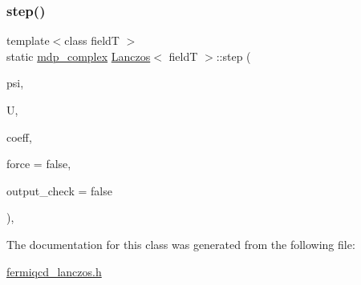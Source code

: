 \subsubsection{\texorpdfstring{step()}{step()}}
{\footnotesize\ttfamily template$<$class fieldT $>$ \\
static \hyperlink{classmdp__complex}{mdp\+\_\+complex} \hyperlink{class_lanczos}{Lanczos}$<$ fieldT $>$\+::step (\begin{DoxyParamCaption}\item[{fieldT \&}]{psi,  }\item[{\hyperlink{classgauge__field}{gauge\+\_\+field} \&}]{U,  }\item[{\hyperlink{classcoefficients}{coefficients} \&}]{coeff,  }\item[{bool}]{force = {\ttfamily false},  }\item[{bool}]{output\+\_\+check = {\ttfamily false} }\end{DoxyParamCaption})\hspace{0.3cm}{\ttfamily [inline]}, {\ttfamily [static]}}



The documentation for this class was generated from the following file\+:\begin{DoxyCompactItemize}
\item 
\hyperlink{fermiqcd__lanczos_8h}{fermiqcd\+\_\+lanczos.\+h}\end{DoxyCompactItemize}
